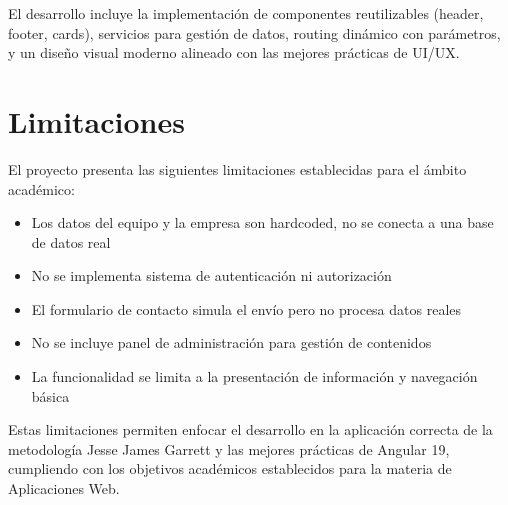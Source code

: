 El desarrollo incluye la implementación de componentes reutilizables (header, footer, cards), servicios para gestión de datos, routing dinámico con parámetros, y un diseño visual moderno alineado con las mejores prácticas de UI/UX.

\section{Limitaciones}

El proyecto presenta las siguientes limitaciones establecidas para el ámbito académico:

\begin{itemize}
    \item Los datos del equipo y la empresa son hardcoded, no se conecta a una base de datos real
    \item No se implementa sistema de autenticación ni autorización
    \item El formulario de contacto simula el envío pero no procesa datos reales
    \item No se incluye panel de administración para gestión de contenidos
    \item La funcionalidad se limita a la presentación de información y navegación básica
\end{itemize}

Estas limitaciones permiten enfocar el desarrollo en la aplicación correcta de la metodología Jesse James Garrett y las mejores prácticas de Angular 19, cumpliendo con los objetivos académicos establecidos para la materia de Aplicaciones Web.

